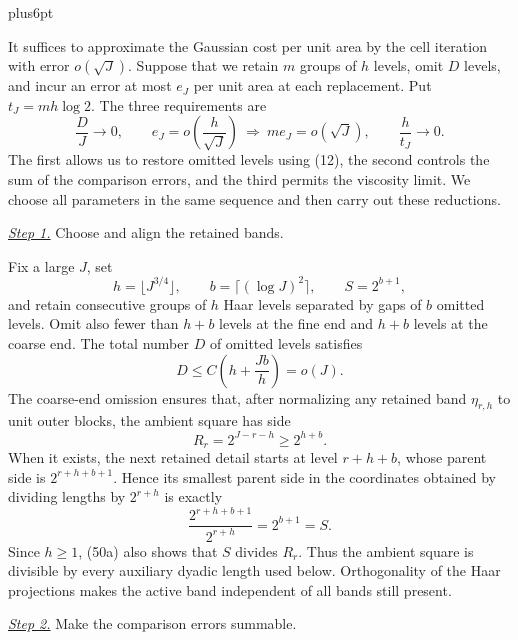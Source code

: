 \documentclass[11pt,reqno]{amsart}
\makeatletter
\theoremstyle{plain}
\theoremstyle{definition}
\theoremstyle{remark}
\renewenvironment{proof}[1][\proofname]{%
  \par
  \pushQED{\qed}%
  \normalfont
  \topsep6pt plus6pt\relax
  \trivlist
  \item[\hskip\labelsep\slshape #1\@addpunct{.}]%
  \ignorespaces
}{%
  \popQED
  \endtrivlist
  \@endpefalse
}
\DeclareRobustCommand{\qed}{%
  \leavevmode\unskip\penalty9999\hbox{}\nobreak
  \ifmmode
    \makebox[0pt][l]{\qquad\hbox{\qedsymbol}}%
  \else
    \qquad\hbox{\qedsymbol}%
  \fi
}
\renewcommand{\qedsymbol}{\rule[.47pt]{4pt}{6pt}}
\numberwithin{equation}{section}
\newcommand{\1}{\mathbf 1}
\makeatother
\begin{document}
\begin{proof}
It suffices to approximate the Gaussian cost per unit area by the cell
iteration with error $o(\sqrt J)$.  Suppose that we retain $m$ groups
of $h$ levels, omit $D$ levels, and incur an error at most $e_J$ per
unit area at each replacement.  Put $t_J=mh\log2$.  The three
requirements are
\begin{equation*}
\frac{D}{J}\longrightarrow0,\qquad
e_J=o\!\left(\frac{h}{\sqrt J}\right)
\ \Longrightarrow\
m e_J=o(\sqrt J),\qquad
\frac{h}{t_J}\longrightarrow0.
\end{equation*}
The first allows us to restore omitted levels using (12), the second
controls the sum of the comparison errors, and the third permits the
viscosity limit.  We choose all parameters in the same sequence and
then carry out these reductions.

\smallskip\noindent
\underline{\textit{Step 1.}} Choose and align the retained bands.

Fix a large $J$, set
\begin{equation*}
h=\lfloor J^{3/4}\rfloor,\qquad b=\lceil(\log J)^2\rceil,\qquad
S=2^{b+1},
\end{equation*}
and retain consecutive groups of $h$ Haar levels separated by gaps of
$b$ omitted levels.  Omit also fewer than $h+b$ levels at the fine
end and $h+b$ levels at the coarse end.  The total number $D$ of
omitted levels satisfies
\begin{equation}
D\leq C\left(h+\frac{Jb}{h}\right)=o(J).
\tag{50}
\end{equation}
The coarse-end omission ensures that, after normalizing any retained
band $\eta_ {r,h}$ to unit outer blocks, the ambient square has side
\begin{equation}
R_ r=2^{J-r-h}\geq2^{h+b}.
\tag{50a}
\end{equation}
When it exists, the next retained detail starts at level $r+h+b$, whose
parent side is $2^{r+h+b+1}$.  Hence its smallest parent side in the
coordinates obtained by dividing lengths by $2^{r+h}$ is exactly
\begin{equation*}
\frac{2^{r+h+b+1}}{2^{r+h}}=2^{b+1}=S.
\end{equation*}
Since $h\geq1$, (50a) also shows that $S$ divides $R_r$.  Thus the
ambient square is divisible by every auxiliary dyadic length used
below.  Orthogonality of the Haar projections makes the active band
independent of all bands still present.

\smallskip\noindent
\underline{\textit{Step 2.}} Make the comparison errors summable.


\end{proof}
\end{document}
